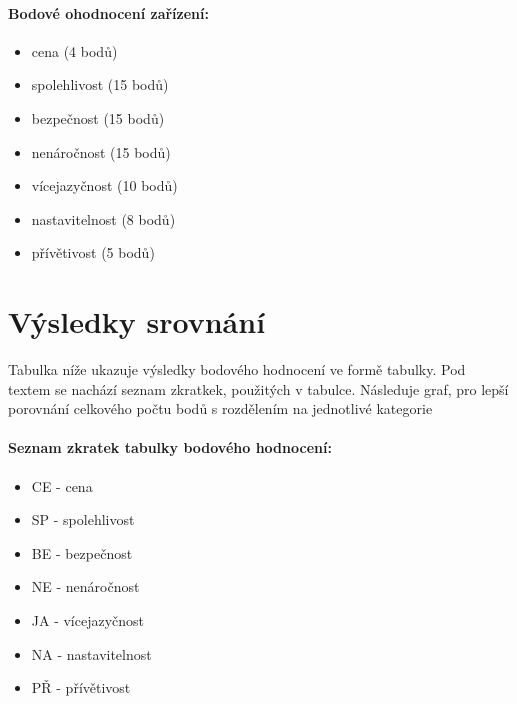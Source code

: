 \documentclass[FM,BP]{tulthesis}  %
\begin{document}
\paragraph{Bodové ohodnocení zařízení:}
\begin{itemize}
\item cena (4 bodů)
\item spolehlivost (15 bodů)
\item bezpečnost (15 bodů)
\item nenáročnost (15 bodů)
\item vícejazyčnost (10 bodů)
\item nastavitelnost (8 bodů)
\item přívětivost (5 bodů)
\end{itemize}


\section{Výsledky srovnání}
Tabulka níže ukazuje výsledky bodového hodnocení ve formě tabulky. Pod textem se nachází seznam zkratkek, použitých v tabulce. Následuje graf, pro lepší  porovnání celkového počtu bodů s rozdělením na jednotlivé kategorie

\paragraph{Seznam zkratek tabulky bodového hodnocení:}
\begin{itemize}
\item CE - cena
\item SP - spolehlivost
\item BE - bezpečnost
\item NE - nenáročnost
\item JA - vícejazyčnost
\item NA - nastavitelnost
\item PŘ - přívětivost
\end{itemize}
\end{document}
